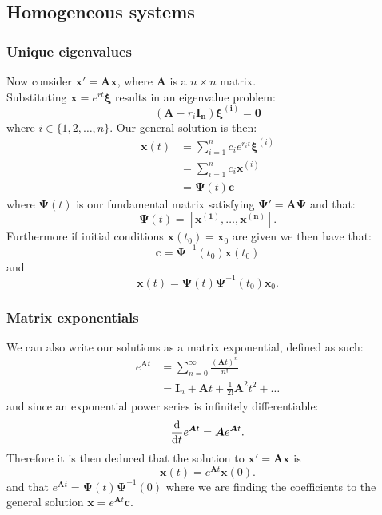 \documentclass{article}
\newcommand{\matr}[1]{\mathbf{#1}}
\begin{document}
\subsection{Homogeneous systems}

\subsubsection{Unique eigenvalues}
Now consider $\boldsymbol{x}'=\matr{A}\boldsymbol{x}$, where $\matr{A}$ is a $n \times n$ matrix. \\
Substituting $\boldsymbol{x}=e^{rt} \boldsymbol{\xi}$ results in an eigenvalue problem:
$$(\matr{A}-r_i \matr{I_n})\boldsymbol{\xi^{(i)}}=\boldsymbol{0}$$
where $i\in\{1,2,\dots, n\}$. Our general solution is then:
\begin{align*}
    \boldsymbol{x}(t)
    &=\sum_{i=1}^{n}c_i e^{r_i t}\boldsymbol{\xi}^{(i)} \\
    &=\sum_{i=1}^{n}c_i\boldsymbol{x}^{(i)} \\
    &=\boldsymbol{\Psi}(t)\boldsymbol{c}
\end{align*}
where $\boldsymbol{\Psi}(t)$ is our fundamental matrix
satisfying $\boldsymbol{\Psi}'=\matr{A}\boldsymbol{\Psi}$ and that:
$$\boldsymbol{\Psi}(t)=[\boldsymbol{x^{(1)}}, \dots, \boldsymbol{x^{(n)}}].$$
Furthermore if initial conditions $\boldsymbol{x}(t_0)=\boldsymbol{x}_0$
are given we then have that:
$$\boldsymbol{c}=\boldsymbol{\Psi}^{-1}(t_0)\boldsymbol{x}(t_0)$$
and
$$\boldsymbol{x}(t)
=\boldsymbol{\Psi}(t)
\boldsymbol{\Psi}^{-1}(t_0)\boldsymbol{x}_0.$$

\subsubsection{Matrix exponentials}
We can also write our solutions as a matrix exponential,
defined as such:
\begin{align*}
    e^{\boldsymbol{A}t}
    &=\sum_{n=0}^{\infty}
    \frac{(\boldsymbol{A}t)^n}{n!} \\
    &=\boldsymbol{I}_n
    +\boldsymbol{A}t
    +\frac{1}{2!}\boldsymbol{A}^2t^2+\dots
\end{align*}
and since an exponential power series is infinitely differentiable:
$$\dv{t}e^{\boldsymbol{A}t}
=\boldsymbol{A}e^{\boldsymbol{A}t}.$$
Therefore it is then deduced that the solution to
$\boldsymbol{x}'=\boldsymbol{A}\boldsymbol{x}$ is
$$\boldsymbol{x}(t)
=e^{\boldsymbol{A}t}\boldsymbol{x}(0).$$
and that $e^{\boldsymbol{A}t}
=\boldsymbol{\Psi}(t)\boldsymbol{\Psi}^{-1}(0)$
where we are finding the coefficients to the
general solution $\boldsymbol{x}
=e^{\boldsymbol{A}t}\boldsymbol{c}$.
\end{document}
